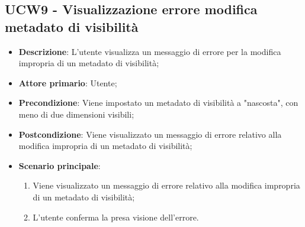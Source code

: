 \subsection{UCW9 - Visualizzazione errore modifica metadato di visibilità}
\label{sub:ucw9}

\begin{itemize}
    \item \textbf{Descrizione}: L'utente visualizza un messaggio di errore per la modifica impropria di un metadato di
          visibilità;

    \item \textbf{Attore primario}: Utente;

    \item \textbf{Precondizione}:   Viene impostato un metadato di visibilità a "nascosta", con meno di due dimensioni
          visibili;

    \item \textbf{Postcondizione}:   Viene visualizzato un messaggio di errore relativo alla modifica impropria di un
          metadato di visibilità;

    \item \textbf{Scenario principale}:
          \begin{enumerate}
              \item Viene visualizzato un messaggio di errore relativo alla modifica impropria di un metadato di visibilità;
              \item L'utente conferma la presa visione dell'errore.
          \end{enumerate}
\end{itemize}